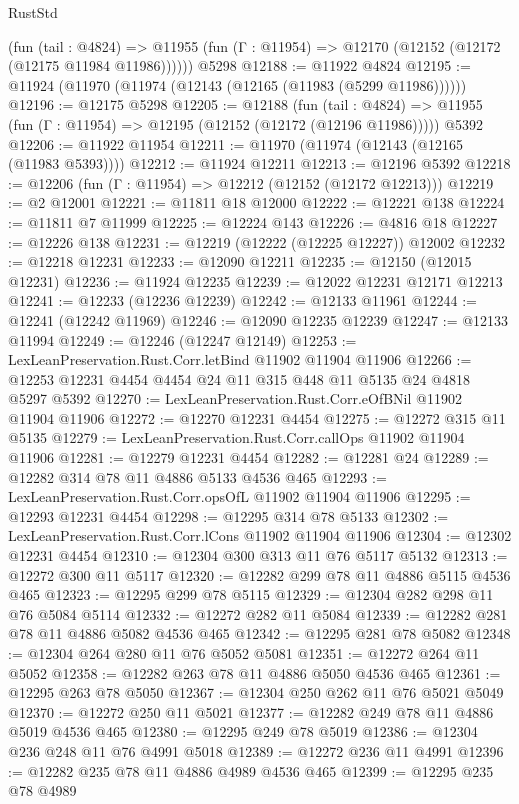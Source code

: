 \begin{lexlean}{RustStd}
\begin{coremodule}
{\begin{coremodule}
{{{{{{{{{{{{{{{{{{{{{{{{{{{{{{{{{{{{{{{{{{{{{{{{{{{{{{{{{{{{{{{{{{{{{{{{{{{{{{{{      (fun (tail : @4824) =>
      @11955 (fun (Γ : @11954) => @12170 (@12152 (@12172 (@12175 @11984 @11986))))))
    @5298
@12188 := @11922 @4824
@12195 := @11924 (@11970 (@11974 (@12143 (@12165 (@11983 (@5299 @11986))))))
@12196 := @12175 @5298
@12205 := @12188
    (fun (tail : @4824) => @11955 (fun (Γ : @11954) => @12195 (@12152 (@12172 (@12196 @11986)))))
    @5392
@12206 := @11922 @11954
@12211 := @11970 (@11974 (@12143 (@12165 (@11983 @5393))))
@12212 := @11924 @12211
@12213 := @12196 @5392
@12218 := @12206 (fun (Γ : @11954) => @12212 (@12152 (@12172 @12213)))
@12219 := @2 @12001
@12221 := @11811 @18 @12000
@12222 := @12221 @138
@12224 := @11811 @7 @11999
@12225 := @12224 @143
@12226 := @4816 @18
@12227 := @12226 @138
@12231 := @12219 (@12222 (@12225 @12227)) @12002
@12232 := @12218 @12231
@12233 := @12090 @12211
@12235 := @12150 (@12015 @12231)
@12236 := @11924 @12235
@12239 := @12022 @12231 @12171 @12213
@12241 := @12233 (@12236 @12239)
@12242 := @12133 @11961
@12244 := @12241 (@12242 @11969)
@12246 := @12090 @12235 @12239
@12247 := @12133 @11994
@12249 := @12246 (@12247 @12149)
@12253 := LexLeanPreservation.Rust.Corr.letBind @11902 @11904 @11906
@12266 := @12253 @12231 @4454 @4454 @24 @11 @315 @448 @11 @5135 @24 @4818 @5297 @5392
@12270 := LexLeanPreservation.Rust.Corr.eOfBNil @11902 @11904 @11906
@12272 := @12270 @12231 @4454
@12275 := @12272 @315 @11 @5135
@12279 := LexLeanPreservation.Rust.Corr.callOps @11902 @11904 @11906
@12281 := @12279 @12231 @4454
@12282 := @12281 @24
@12289 := @12282 @314 @78 @11 @4886 @5133 @4536 @465
@12293 := LexLeanPreservation.Rust.Corr.opsOfL @11902 @11904 @11906
@12295 := @12293 @12231 @4454
@12298 := @12295 @314 @78 @5133
@12302 := LexLeanPreservation.Rust.Corr.lCons @11902 @11904 @11906
@12304 := @12302 @12231 @4454
@12310 := @12304 @300 @313 @11 @76 @5117 @5132
@12313 := @12272 @300 @11 @5117
@12320 := @12282 @299 @78 @11 @4886 @5115 @4536 @465
@12323 := @12295 @299 @78 @5115
@12329 := @12304 @282 @298 @11 @76 @5084 @5114
@12332 := @12272 @282 @11 @5084
@12339 := @12282 @281 @78 @11 @4886 @5082 @4536 @465
@12342 := @12295 @281 @78 @5082
@12348 := @12304 @264 @280 @11 @76 @5052 @5081
@12351 := @12272 @264 @11 @5052
@12358 := @12282 @263 @78 @11 @4886 @5050 @4536 @465
@12361 := @12295 @263 @78 @5050
@12367 := @12304 @250 @262 @11 @76 @5021 @5049
@12370 := @12272 @250 @11 @5021
@12377 := @12282 @249 @78 @11 @4886 @5019 @4536 @465
@12380 := @12295 @249 @78 @5019
@12386 := @12304 @236 @248 @11 @76 @4991 @5018
@12389 := @12272 @236 @11 @4991
@12396 := @12282 @235 @78 @11 @4886 @4989 @4536 @465
@12399 := @12295 @235 @78 @4989
}}}}}}}}}}}}}}}}}}}}}}}}}}}}}}}}}}}}}}}}}}}}}}}}}}}}}}}}}}}}}}}}}}}}}}}}}}}}}}}}
\end{coremodule}}
\end{coremodule}
\end{lexlean}

